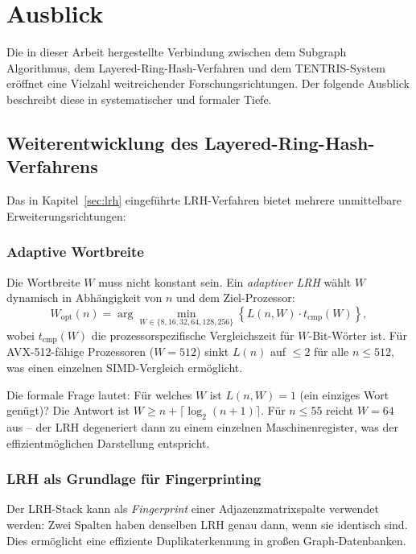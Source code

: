 ﻿\documentclass[a4paper,12pt]{article}
\theoremstyle{definition}
\begin{document}
\section{Ausblick}
\label{sec:ausblick}

Die in dieser Arbeit hergestellte Verbindung zwischen dem Subgraph Algorithmus, dem
Layered-Ring-Hash-Verfahren und dem TENTRIS-System eröffnet eine Vielzahl
weitreichender Forschungsrichtungen. Der folgende Ausblick beschreibt diese in
systematischer und formaler Tiefe.

\subsection{Weiterentwicklung des Layered-Ring-Hash-Verfahrens}

Das in Kapitel~\ref{sec:lrh} eingeführte LRH-Verfahren bietet mehrere unmittelbare
Erweiterungsrichtungen:

\subsubsection{Adaptive Wortbreite}

Die Wortbreite $W$ muss nicht konstant sein. Ein \emph{adaptiver LRH} wählt $W$
dynamisch in Abhängigkeit von $n$ und dem Ziel-Prozessor:
\[
  W_{\mathrm{opt}}(n) = \arg\min_{W \in \{8,16,32,64,128,256\}}
  \left\{ L(n,W) \cdot t_{\mathrm{cmp}}(W) \right\},
\]
wobei $t_{\mathrm{cmp}}(W)$ die prozessorspezifische Vergleichszeit für $W$-Bit-Wörter
ist. Für AVX-512-fähige Prozessoren ($W=512$) sinkt $L(n)$ auf $\leq 2$ für alle
$n \leq 512$, was einen einzelnen SIMD-Vergleich ermöglicht.

Die formale Frage lautet: Für welches $W$ ist $L(n, W) = 1$ (ein einziges Wort
genügt)? Die Antwort ist $W \geq n + \lceil \log_2(n+1) \rceil$. Für $n \leq 55$
reicht $W=64$ aus -- der LRH degeneriert dann zu einem einzelnen Maschinenregister,
was der effizientmöglichen Darstellung entspricht.

\subsubsection{LRH als Grundlage für Fingerprinting}

Der LRH-Stack kann als \emph{Fingerprint} einer Adjazenzmatrixspalte verwendet werden:
Zwei Spalten haben denselben LRH genau dann, wenn sie identisch sind. Dies ermöglicht
eine effiziente Duplikaterkennung in großen Graph-Datenbanken.
\end{document}
